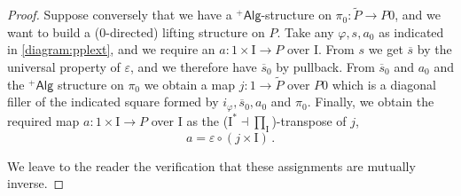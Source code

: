 \documentclass[11pt]{article}
\newcommand{\plusalgx}{\ensuremath{^+\!\mathsf{Alg}}}
\newcommand{\I}{\ensuremath{\mathrm{I}}}
\theoremstyle{remark}
\theoremstyle{definition}
\begin{document}
\begin{proof}
Suppose conversely that we have a $\plusalgx$-structure on $\pi_0 : \widetilde{P} \to P0$, and we want to build a (0-directed) lifting structure on $P$.  Take any $\varphi, s, a_0$ as indicated in \eqref{diagram:pplext}, and we require an $a : 1\times\I\to P$ over $\I$.    From $s$ we get $\overline{s}$ by the universal property of $\varepsilon$, and we therefore have $\overline{s}_0$ by pullback.   From $\overline{s}_0$ and $a_0$ and the $\plusalgx$ structure on $\pi_0$ we obtain a map $j : 1 \to \widetilde{P}$ over $P0$ which is a diagonal filler of the indicated square formed by $i_\varphi, \overline{s}_0, a_0$ and $\pi_0$.  Finally, we obtain the required map $a : 1\times\I\to P$ over $\I$ as the ($\I^* \dashv \prod_{\I}$)-transpose of $j$,
\[
a = \varepsilon \circ(j\times\I)\,.
\]

We leave to the reader the verification that these assignments are mutually inverse.
\end{proof}

\end{document}
